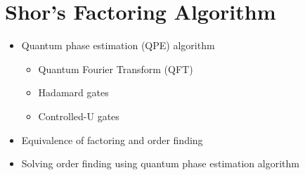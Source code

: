 \documentclass[]{book}
\theoremstyle{nonumberplain}
\begin{document}
\section{Shor's Factoring Algorithm}
\begin{itemize}
    \item Quantum phase estimation (QPE) algorithm
    \begin{itemize}
        \item Quantum Fourier Transform (QFT) 
        \item Hadamard gates
        \item Controlled-U gates
    \end{itemize}
    \item Equivalence of factoring and order finding
    \item Solving order finding using quantum phase estimation algorithm
\end{itemize}
\end{document}
